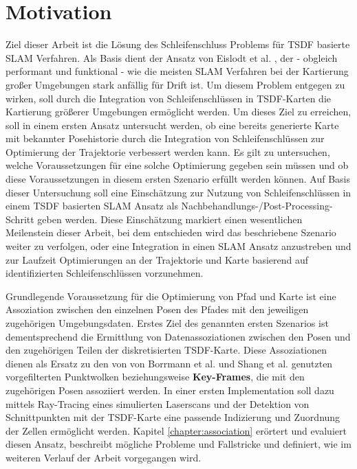 \section{Motivation}

Ziel dieser Arbeit ist die Lösung des Schleifenschluss Problems für TSDF basierte SLAM Verfahren.
Als Basis dient der Ansatz von Eislodt et al. \cite{HATSDF}, der - obgleich performant und funktional - wie die meisten SLAM Verfahren bei der Kartierung großer Umgebungen stark anfällig für Drift ist. Um diesem Problem entgegen zu wirken, soll durch die Integration von Schleifenschlüssen in TSDF-Karten die Kartierung größerer Umgebungen ermöglicht werden.
Um dieses Ziel zu erreichen, soll in einem ersten Ansatz untersucht werden, ob eine bereits generierte Karte mit bekannter Posehistorie durch die Integration von Schleifenschlüssen zur Optimierung der Trajektorie verbessert werden kann.
Es gilt zu untersuchen, welche Voraussetzungen für eine solche Optimierung gegeben sein müssen und ob diese Voraussetzungen in diesem ersten Szenario erfüllt werden können.
Auf Basis dieser Untersuchung soll eine Einschätzung zur Nutzung von Schleifenschlüssen in einem TSDF basierten SLAM Ansatz als Nachbehandlungs-/Post-Processing-Schritt geben werden.
Diese Einschätzung markiert einen wesentlichen Meilenstein dieser Arbeit, bei dem entschieden wird das beschriebene Szenario weiter zu verfolgen, oder eine Integration in einen SLAM Ansatz anzustreben und zur Laufzeit Optimierungen an der Trajektorie und Karte basierend auf identifizierten Schleifenschlüssen vorzunehmen.

Grundlegende Voraussetzung für die Optimierung von Pfad und Karte ist eine Assoziation zwischen den einzelnen Posen des Pfades mit den jeweiligen zugehörigen Umgebungsdaten.
Erstes Ziel des genannten ersten Szenarios ist dementsprechend die Ermittlung von Datenassoziationen zwischen den Posen und den zugehörigen Teilen der diskretisierten TSDF-Karte.
Diese Assoziationen dienen als Ersatz zu den von von Borrmann et al. \cite{borrmann2008globally} und Shang et al. \cite{shan2020lio} genutzten vorgefilterten Punktwolken beziehungsweise \textbf{Key-Frames}, die mit den zugehörigen Posen assoziiert werden.
In einer ersten Implementation soll dazu mittels Ray-Tracing eines simulierten Laserscans und der Detektion von Schnittpunkten mit der TSDF-Karte eine passende Indizierung und Zuordnung der Zellen ermöglicht werden.
Kapitel \ref{chapter:association} erörtert und evaluiert diesen Ansatz, beschreibt mögliche Probleme und Fallstricke und definiert, wie im weiteren Verlauf der Arbeit vorgegangen wird.

